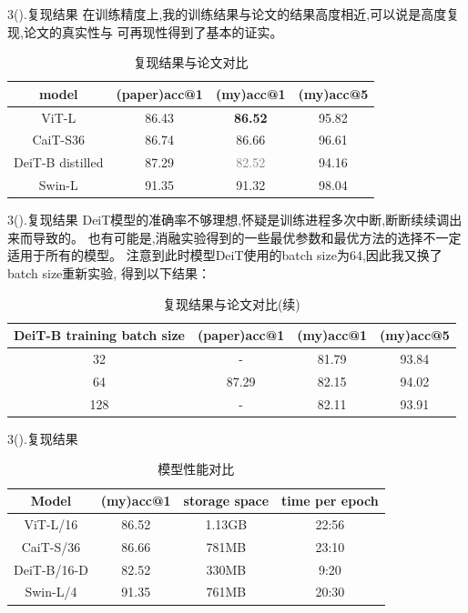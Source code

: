 \documentclass[UTF8]{ctexbeamer}
\begin{document}
\begin{frame}{3(\ast).复现结果}
  在训练精度上,我的训练结果与论文的结果高度相近,可以说是高度复现,论文的真实性与
  可再现性得到了基本的证实。
  \begin{table}[h!]
    \centering
    \begin{tabular}{|c|c|c|c|}
    \hline
    model & (paper)acc@1 & (my)acc@1 & (my)acc@5 \\
    \hline
    ViT-L & 86.43 & \textbf{86.52} & 95.82 \\
    CaiT-S36 & 86.74 & 86.66 & 96.61 \\
    DeiT-B distilled & 87.29 & \textcolor{gray}{82.52} & 94.16 \\
    Swin-L & 91.35 & 91.32 & 98.04 \\
    \hline
    \end{tabular}
    \caption{复现结果与论文对比}
    \end{table}
\end{frame}

\begin{frame}{3(\ast).复现结果}
  DeiT模型的准确率不够理想,怀疑是训练进程多次中断,断断续续调出来而导致的。
  也有可能是,消融实验得到的一些最优参数和最优方法的选择不一定适用于所有的模型。
  注意到此时模型DeiT使用的batch size为64,因此我又换了batch size重新实验,
  得到以下结果：
  \begin{table}[]
    \centering
    \begin{tabular}{|c|c|c|c|}
    \hline
    DeiT-B training batch size & (paper)acc@1 & (my)acc@1 & (my)acc@5 \\ \hline
    32 & - & 81.79 & 93.84\\
    64 & 87.29 & 82.15 & 94.02 \\
    128 & - & 82.11 & 93.91 \\ \hline
    \end{tabular}
    \caption{复现结果与论文对比(续)}
    \end{table}    
\end{frame}

\begin{frame}{3(\ast).复现结果}
  \begin{table}[h!]
    \centering
    \begin{tabular}{|c|c|c|c|}
    \hline
    Model & (my)acc@1 & storage space & time per epoch \\
    \hline
    ViT-L/16 & 86.52 & 1.13GB & 22:56 \\
    CaiT-S/36 & 86.66 & 781MB & 23:10 \\
    DeiT-B/16-D & 82.52 & 330MB & 9:20 \\
    Swin-L/4 & 91.35 & 761MB & 20:30 \\
    \hline
    \end{tabular}
    \caption{模型性能对比}
  \end{table}
    
\end{frame}
\end{document}
